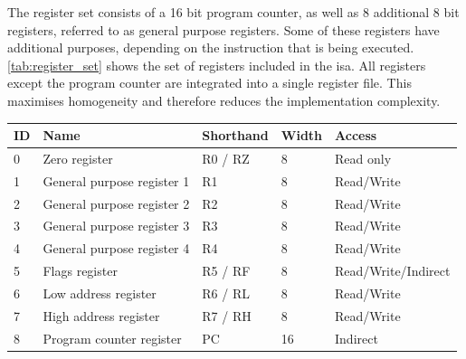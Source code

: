 The register set consists of a 16 bit program counter, as well as 8 additional 8 bit registers, referred to as general purpose registers. Some of these registers have additional purposes, depending on the instruction that is being executed. \autoref{tab:register_set} shows the set of registers included in the \ac{isa}. All registers except the program counter are integrated into a single register file. This maximises homogeneity and therefore reduces the implementation complexity.

\begin{minipage}[t]{\textwidth}
    \centering
    \begin{tabular}{|l|l|l|l|l|} 
        \hline
        \textbf{ID} & \textbf{Name}              & \textbf{Shorthand} & \textbf{Width} & \textbf{Access}      \\ 
        \hline
        0           & Zero register              & R0 / RZ            & 8              & Read only            \\ 
        \hline
        1           & General purpose register 1 & R1                 & 8              & Read/Write           \\ 
        \hline
        2           & General purpose register 2 & R2                 & 8              & Read/Write           \\ 
        \hline
        3           & General purpose register 3 & R3                 & 8              & Read/Write           \\ 
        \hline
        4           & General purpose register 4 & R4                 & 8              & Read/Write           \\ 
        \hline
        5           & Flags register             & R5 / RF            & 8              & Read/Write/Indirect  \\ 
        \hline
        6           & Low address register       & R6 / RL            & 8              & Read/Write           \\ 
        \hline
        7           & High address register      & R7 / RH            & 8              & Read/Write           \\ 
        \hline
        8           & Program counter register   & PC                 & 16             & Indirect             \\
        \hline
    \end{tabular}
    \label{tab:register_set}
\end{minipage}

